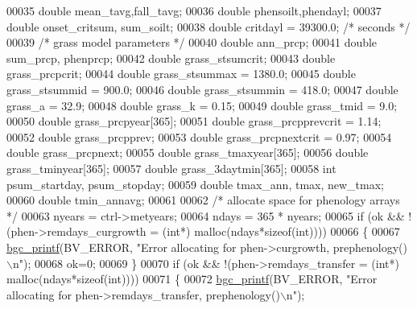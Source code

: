 \begin{DoxyCode}
00035     \textcolor{keywordtype}{double} mean\_tavg,fall\_tavg;
00036     \textcolor{keywordtype}{double} phensoilt,phendayl;
00037     \textcolor{keywordtype}{double} onset\_critsum, sum\_soilt;
00038     \textcolor{keywordtype}{double} critdayl = 39300.0; \textcolor{comment}{/* seconds */}
00039     \textcolor{comment}{/* grass model parameters */}
00040     \textcolor{keywordtype}{double} ann\_prcp;
00041     \textcolor{keywordtype}{double} sum\_prcp, phenprcp;
00042     \textcolor{keywordtype}{double} grass\_stsumcrit;
00043     \textcolor{keywordtype}{double} grass\_prcpcrit;
00044     \textcolor{keywordtype}{double} grass\_stsummax = 1380.0;
00045     \textcolor{keywordtype}{double} grass\_stsummid = 900.0;
00046     \textcolor{keywordtype}{double} grass\_stsummin = 418.0;
00047     \textcolor{keywordtype}{double} grass\_a = 32.9;
00048     \textcolor{keywordtype}{double} grass\_k = 0.15;
00049     \textcolor{keywordtype}{double} grass\_tmid = 9.0;
00050     \textcolor{keywordtype}{double} grass\_prcpyear[365];
00051     \textcolor{keywordtype}{double} grass\_prcpprevcrit = 1.14;
00052     \textcolor{keywordtype}{double} grass\_prcpprev;
00053     \textcolor{keywordtype}{double} grass\_prcpnextcrit = 0.97;
00054     \textcolor{keywordtype}{double} grass\_prcpnext;
00055     \textcolor{keywordtype}{double} grass\_tmaxyear[365];
00056     \textcolor{keywordtype}{double} grass\_tminyear[365];
00057     \textcolor{keywordtype}{double} grass\_3daytmin[365];
00058     \textcolor{keywordtype}{int} psum\_startday, psum\_stopday;
00059     \textcolor{keywordtype}{double} tmax\_ann, tmax, new\_tmax;
00060     \textcolor{keywordtype}{double} tmin\_annavg;
00061 
00062     \textcolor{comment}{/* allocate space for phenology arrays */}
00063     nyears = ctrl->metyears;
00064     ndays = 365 * nyears;
00065     \textcolor{keywordflow}{if} (ok && !(phen->remdays\_curgrowth = (\textcolor{keywordtype}{int}*) malloc(ndays*\textcolor{keyword}{sizeof}(\textcolor{keywordtype}{int}))))
00066     \{
00067         \hyperlink{bgc__io_8c_af287cce6e2aede1ce337de9319e80d0d}{bgc\_printf}(BV\_ERROR, \textcolor{stringliteral}{"Error allocating for phen->curgrowth, prephenology()\(\backslash\)n"});
00068         ok=0;
00069     \}
00070     \textcolor{keywordflow}{if} (ok && !(phen->remdays\_transfer = (\textcolor{keywordtype}{int}*) malloc(ndays*\textcolor{keyword}{sizeof}(\textcolor{keywordtype}{int}))))
00071     \{
00072         \hyperlink{bgc__io_8c_af287cce6e2aede1ce337de9319e80d0d}{bgc\_printf}(BV\_ERROR, \textcolor{stringliteral}{"Error allocating for phen->remdays\_transfer, prephenology()\(\backslash\)n"});

\end{DoxyCode}
